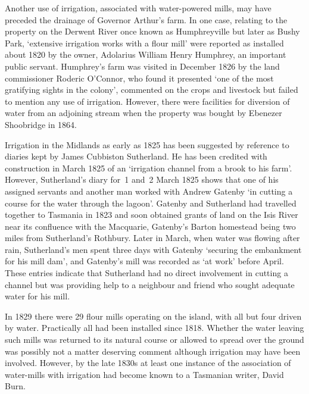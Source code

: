 Another use of irrigation, associated with water-powered mills, may
have preceded the drainage of Governor Arthur's farm.  In one case,
relating to the property on the Derwent River 
once known as Humphreyville but later as Bushy Park,
`extensive irrigation works with a flour mill' were reported as
installed about 1820 by the owner, Adolarius William Henry
Humphrey,  an important public servant.
Humphrey's farm was visited in December 1826 by the land commissioner
Roderic O'Connor, who found it presented `one of the most gratifying
sights in the colony', commented on the crops and livestock but failed
to mention any use of irrigation.  However, there were facilities for
diversion of water from an adjoining stream when the property was
bought by Ebenezer Shoobridge in
1864.

Irrigation in the Midlands as early as 1825 has been
suggested by reference to diaries kept by James Cubbiston
Sutherland. He has been credited with
construction in March 1825 of an `irrigation channel from a brook to
his farm'. However, Sutherland's diary for~1 and~2 March 1825 shows
that one of his assigned servants and another man worked with Andrew
Gatenby `in cutting a course for the water through
the lagoon'.  Gatenby and Sutherland had travelled together to
Tasmania in 1823 and soon obtained grants of land on the Isis
River near its confluence with the
Macquarie, Gatenby's Barton homestead being two
miles from Sutherland's Rothbury.  Later in March, when water was
flowing after rain, Sutherland's men spent three days with Gatenby
`securing the embankment for his mill dam', and Gatenby's mill was
recorded as `at work' before April.  These entries indicate that
Sutherland had no direct involvement in cutting a channel but was
providing help to a neighbour and friend who sought adequate water for
his mill.

In 1829 there were 29 flour mills operating on the
island, with all but four driven by water.  Practically all had been
installed since 1818.  Whether the water leaving such mills was
returned to its natural course or allowed to spread over the ground
was possibly not a matter deserving comment although irrigation may
have been involved. However, by the late 1830s at least one instance
of the association of water-mills with irrigation had become known to
a Tasmanian writer, David Burn.

